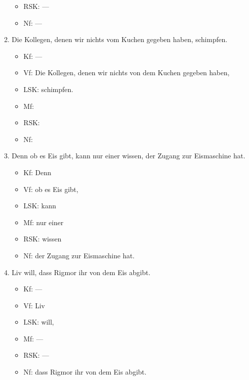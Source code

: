 \begin{enumerate}
\begin{itemize}
      \item RSK: ---
      \item Nf: ---
    \end{itemize}
  \item Die Kollegen, denen wir nichts vom Kuchen gegeben haben, schimpfen.
    \begin{itemize}
      \item Kf: ---
      \item Vf: Die Kollegen, denen wir nichts von dem Kuchen gegeben haben,
      \item LSK: schimpfen.
      \item Mf: 
      \item RSK: 
      \item Nf: 
    \end{itemize}

\Np

  \item Denn ob es Eis gibt, kann nur einer wissen, der Zugang zur Eismaschine hat.
    \begin{itemize}
      \item Kf: Denn
      \item Vf: ob es Eis gibt,
      \item LSK: kann
      \item Mf: nur einer
      \item RSK: wissen
      \item Nf: der Zugang zur Eismaschine hat.
    \end{itemize}
  \item Liv will, dass Rigmor ihr von dem Eis abgibt.
    \begin{itemize}
      \item Kf: ---
      \item Vf: Liv
      \item LSK: will,
      \item Mf: ---
      \item RSK: ---
      \item Nf: dass Rigmor ihr von dem Eis abgibt.
    \end{itemize}
\end{enumerate}

\label{sol:saetze03}

